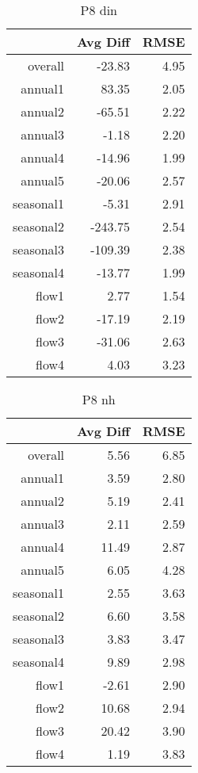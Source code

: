 \begin{table}[H]
\centering
\begin{tabular}{rrr}
  \hline
 & Avg Diff & RMSE \\ 
  \hline
overall & -23.83 & 4.95 \\ 
  annual1 & 83.35 & 2.05 \\ 
  annual2 & -65.51 & 2.22 \\ 
  annual3 & -1.18 & 2.20 \\ 
  annual4 & -14.96 & 1.99 \\ 
  annual5 & -20.06 & 2.57 \\ 
  seasonal1 & -5.31 & 2.91 \\ 
  seasonal2 & -243.75 & 2.54 \\ 
  seasonal3 & -109.39 & 2.38 \\ 
  seasonal4 & -13.77 & 1.99 \\ 
  flow1 & 2.77 & 1.54 \\ 
  flow2 & -17.19 & 2.19 \\ 
  flow3 & -31.06 & 2.63 \\ 
  flow4 & 4.03 & 3.23 \\ 
   \hline
\end{tabular}
\caption{P8 din} 
\end{table}
\begin{table}[H]
\centering
\begin{tabular}{rrr}
  \hline
 & Avg Diff & RMSE \\ 
  \hline
overall & 5.56 & 6.85 \\ 
  annual1 & 3.59 & 2.80 \\ 
  annual2 & 5.19 & 2.41 \\ 
  annual3 & 2.11 & 2.59 \\ 
  annual4 & 11.49 & 2.87 \\ 
  annual5 & 6.05 & 4.28 \\ 
  seasonal1 & 2.55 & 3.63 \\ 
  seasonal2 & 6.60 & 3.58 \\ 
  seasonal3 & 3.83 & 3.47 \\ 
  seasonal4 & 9.89 & 2.98 \\ 
  flow1 & -2.61 & 2.90 \\ 
  flow2 & 10.68 & 2.94 \\ 
  flow3 & 20.42 & 3.90 \\ 
  flow4 & 1.19 & 3.83 \\ 
   \hline
\end{tabular}
\caption{P8 nh} 
\end{table}
